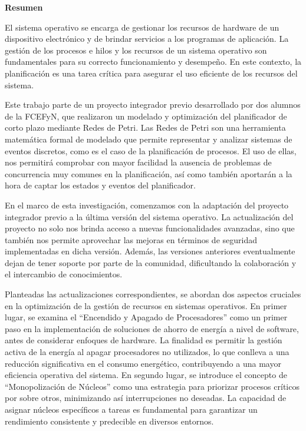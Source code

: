 \begin{Large}
    \textbf{Resumen}
    \vspace{.5cm}
\end{Large}

El sistema operativo se encarga de gestionar los recursos de hardware de un dispositivo electrónico y de brindar servicios a los programas de aplicación. La gestión de los procesos e hilos y los recursos de un sistema operativo son fundamentales para su correcto funcionamiento y desempeño. En este contexto, la planificación es una tarea crítica para asegurar el uso eficiente de los recursos del sistema.\par

Este trabajo parte de un proyecto integrador previo desarrollado por dos alumnos de la FCEFyN, que realizaron un modelado y optimización del planificador de corto plazo mediante Redes de Petri. Las Redes de Petri son una herramienta matemática formal de modelado que permite representar y analizar sistemas de eventos discretos, como es el caso de la planificación de procesos. El uso de ellas, nos permitirá comprobar con mayor facilidad la ausencia de problemas de concurrencia muy comunes en la planificación, así como también aportarán a la hora de captar los estados y eventos del planificador.\par

En el marco de esta investigación, comenzamos con la adaptación del proyecto integrador previo a la última versión del sistema operativo. La actualización del proyecto no solo nos brinda acceso a nuevas funcionalidades avanzadas, sino que también nos permite aprovechar las mejoras en términos de seguridad implementadas en dicha versión. Además, las versiones anteriores eventualmente dejan de tener soporte por parte de la comunidad, dificultando la colaboración y el intercambio de conocimientos.\par

Planteadas las actualizaciones correspondientes, se abordan dos aspectos cruciales en la optimización de la gestión de recursos en sistemas operativos. En primer lugar, se examina el ``Encendido y Apagado de Procesadores'' como un primer paso en la implementación de soluciones de ahorro de energía a nivel de software, antes de considerar enfoques de hardware. La finalidad es permitir la gestión activa de la energía al apagar procesadores no utilizados, lo que conlleva a una reducción significativa en el consumo energético, contribuyendo a una mayor eficiencia operativa del sistema. En segundo lugar, se introduce el concepto de ``Monopolización de Núcleos'' como una estrategia para priorizar procesos críticos por sobre otros, minimizando así interrupciones no deseadas. La capacidad de asignar núcleos específicos a tareas es fundamental para garantizar un rendimiento consistente y predecible en diversos entornos. \par
